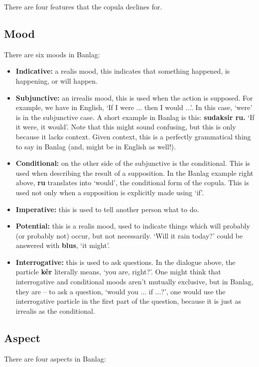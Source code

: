 \documentclass[12pt]{report}
\begin{document}
There are four features that the copula declines for. 

\subsection{Mood}

There are six moods in Banlag:

\begin{itemize}
\item \textbf{Indicative:} a realis mood, this indicates that something happened, is happening, or will happen.
\item \textbf{Subjunctive:} an irrealis mood, this is used when the action is supposed. For example, we have in English, `If I were ... then I would ...'. In this case, `were' is in the subjunctive case. A short example in Banlag is this: \textbf{sudaksir ru.} `If it were, it would'. Note that this might sound confusing, but this is only because it lacks context. Given context, this is a perfectly grammatical thing to say in Banlag (and, might be in English as well!).
\item \textbf{Conditional:} on the other side of the subjunctive is the conditional. This is used when describing the result of a supposition. In the Banlag example right above, \textbf{ru} translates into `would', the conditional form of the copula. This is used not only when a supposition is explicitly made using `if'.
\item \textbf{Imperative:} this is used to tell another person what to do.
\item \textbf{Potential:} this is a realis mood, used to indicate things which will probably (or probably not) occur, but not necessarily. `Will it rain today?' could be answered with \textbf{blus}, `it might'.
\item \textbf{Interrogative:} this is used to ask questions. In the dialogue above, the particle \textbf{k\^ er} literally means, `you are, right?'. One might think that interrogative and conditional moods aren't mutually exclusive, but in Banlag, they are -- to ask a question, `would you ... if ...?', one would use the interrogative particle in the first part of the question, because it is just as irrealis as the conditional.
\end{itemize}

\subsection{Aspect}
There are four aspects in Banlag:
\end{document}
